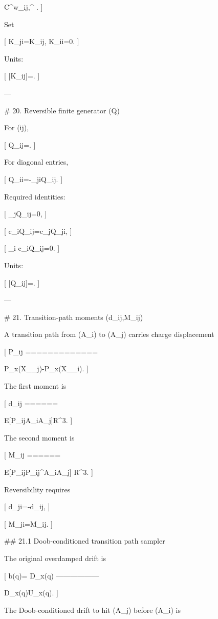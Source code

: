 C^\circ w_{ij,\ell}^{\Sigma}
\exp{}.
]

Set

[
K_{ji}=K_{ij},
\qquad
K_{ii}=0.
]

Units:

[
[K_{ij}]=.
]

---

# 20. Reversible finite generator (Q)

For (i\ne j),

[
Q_{ij}=.
]

For diagonal entries,

[
Q_{ii}=-\sum_{j\ne i}Q_{ij}.
]

Required identities:

[
\sum_jQ_{ij}=0,
]

[
c_iQ_{ij}=c_jQ_{ji},
]

[
\sum_i c_iQ_{ij}=0.
]

Units:

[
[Q_{ij}]=.
]

---

# 21. Transition-path moments (d_{ij},M_{ij})

A transition path from (A_i) to (A_j) carries charge displacement

[
\Delta P_{ij}
=============

P_x(X_{\tau_j})-P_x(X_{\tau_i}).
]

The first moment is

[
d_{ij}
======

\mathbb E[\Delta P_{ij}\mid A_i\to A_j]\in\mathbb R^3.
]

The second moment is

[
M_{ij}
======

\mathbb E[\Delta P_{ij}\Delta P_{ij}^\top\mid A_i\to A_j]
\in\mathbb R^{3}.
]

Reversibility requires

[
d_{ji}=-d_{ij},
]

[
M_{ji}=M_{ij}.
]

## 21.1 Doob-conditioned transition path sampler

The original overdamped drift is

[
b(q)=
\nabla\cdot D_x(q)
------------------

D_x(q)\nabla U_x(q).
]

The Doob-conditioned drift to hit (A_j) before (A_i) is

